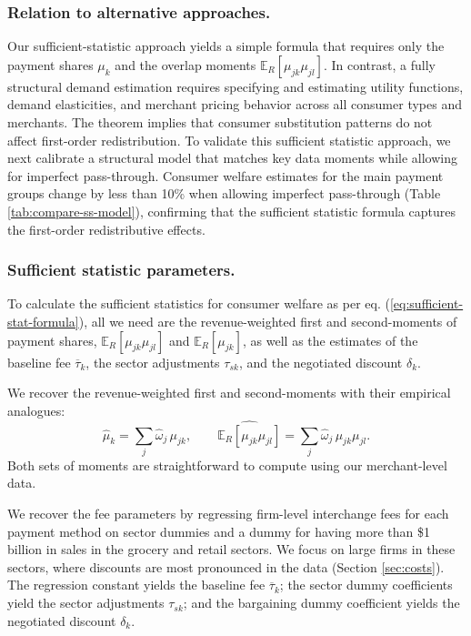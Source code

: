 \documentclass[11pt,english]{article}
\theoremstyle{remark}
\begin{document}
\subsubsection{Relation to alternative approaches.}

Our sufficient-statistic approach yields a simple formula that requires only the payment shares $\mu_k$ and the overlap moments $\mathbb{E}_R[\mu_{jk}\mu_{jl}]$.
In contrast, a fully structural demand estimation requires specifying and estimating utility functions, demand elasticities, and merchant pricing behavior across all consumer types and merchants.
The theorem implies that consumer substitution patterns do not affect first-order redistribution.
To validate this sufficient statistic approach, we next calibrate a structural model that matches key data moments while allowing for imperfect pass-through.
Consumer welfare estimates for the main payment groups change by less than 10\% when allowing imperfect pass-through (Table \ref{tab:compare-ss-model}), confirming that the sufficient statistic formula captures the first-order redistributive effects.

\subsubsection{Sufficient statistic parameters.}

To calculate the sufficient statistics for consumer welfare as per eq. (\ref{eq:sufficient-stat-formula}), all we need are the revenue-weighted first and second-moments of payment shares, $\mathbb{E}_R\!\left[\mu_{jk}\mu_{jl}\right]$ and $\mathbb{E}_R\!\left[\mu_{jk}\right]$, as well as the estimates of the baseline fee $\overline{\tau}_k$, the sector adjustments $\tau_{sk}$, and the negotiated discount $\delta_k$. 

We recover the revenue-weighted first and second-moments with their empirical analogues:
\[
\widehat{\mu}_k = \sum_j \widehat \omega_j\,\mu_{jk}, \qquad
\widehat{\mathbb{E}_R[\mu_{jk}\mu_{jl}]} = \sum_j \widehat \omega_j\,\mu_{jk}\mu_{jl}.
\]
Both sets of moments are straightforward to compute using our merchant-level data.

We recover the fee parameters by regressing firm-level interchange fees for each payment method on sector dummies and a dummy for having more than \$1 billion in sales in the grocery and retail sectors.
We focus on large firms in these sectors, where discounts are most pronounced in the data (Section \ref{sec:costs}).
The regression constant yields the baseline fee $\overline{\tau}_k$; the sector dummy coefficients yield the sector adjustments $\tau_{sk}$; and the bargaining dummy coefficient yields the negotiated discount $\delta_k$.
\end{document}
